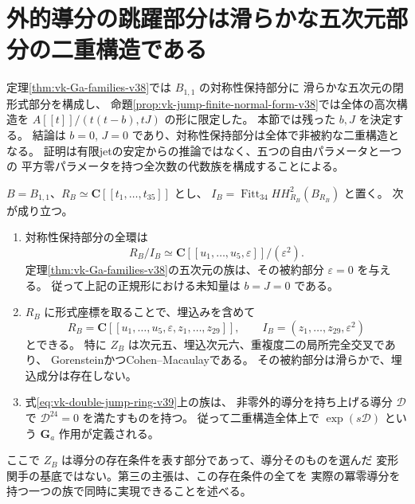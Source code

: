 \section{外的導分の跳躍部分は滑らかな五次元部分の二重構造である}
\label{sec:vk-double-symmetry-v39}

定理\ref{thm:vk-Ga-families-v38}では $B_{1,1}$ の対称性保持部分に
滑らかな五次元の閉形式部分を構成し、
命題\ref{prop:vk-jump-finite-normal-form-v38}では全体の高次構造を
$A[[t]]/(t(t-b),tJ)$ の形に限定した。
本節では残った $b,J$ を決定する。
結論は $b=0$, $J=0$ であり、対称性保持部分は全体で非被約な二重構造となる。
証明は有限jetの安定からの推論ではなく、五つの自由パラメータと一つの
平方零パラメータを持つ全次数の代数族を構成することによる。

\begin{theorem}[対称性保持部分の全完備局所環]
\label{thm:vk-double-jump-v39}
$B=B_{1,1}$、$R_B\simeq\mathbf C[[t_1,\ldots,t_{35}]]$ とし、
$I_B=\operatorname{Fitt}_{34}HH^2_{R_B}(B_{R_B})$ と置く。
次が成り立つ。
\begin{enumerate}
\item 対称性保持部分の全環は
\begin{equation}
 R_B/I_B\simeq
 \mathbf C[[u_1,\ldots,u_5,\varepsilon]]/(\varepsilon^2).
 \label{eq:vk-double-jump-ring-v39}
\end{equation}
定理\ref{thm:vk-Ga-families-v38}の五次元の族は、その被約部分 $\varepsilon=0$ を与える。
従って上記の正規形における未知量は $b=J=0$ である。
\item $R_B$ に形式座標を取ることで、埋込みを含めて
\begin{equation}
 R_B=\mathbf C[[u_1,\ldots,u_5,\varepsilon,z_1,\ldots,z_{29}]],
 \qquad I_B=(z_1,\ldots,z_{29},\varepsilon^2)
 \label{eq:vk-double-embedded-ideal-v39}
\end{equation}
とできる。
特に $Z_B$ は次元五、埋込次元六、重複度二の局所完全交叉であり、
GorensteinかつCohen--Macaulayである。
その被約部分は滑らかで、埋込成分は存在しない。
\item 式\eqref{eq:vk-double-jump-ring-v39}上の族は、
非零外的導分を持ち上げる導分 $\mathcal D$ で
$\mathcal D^{24}=0$ を満たすものを持つ。
従って二重構造全体上で $\exp(s\mathcal D)$ という
$\mathbf G_a$ 作用が定義される。
\end{enumerate}
\end{theorem}

ここで $Z_B$ は導分の存在条件を表す部分であって、導分そのものを選んだ
変形関手の基底ではない。第三の主張は、この存在条件の全てを
実際の冪零導分を持つ一つの族で同時に実現できることを述べる。

